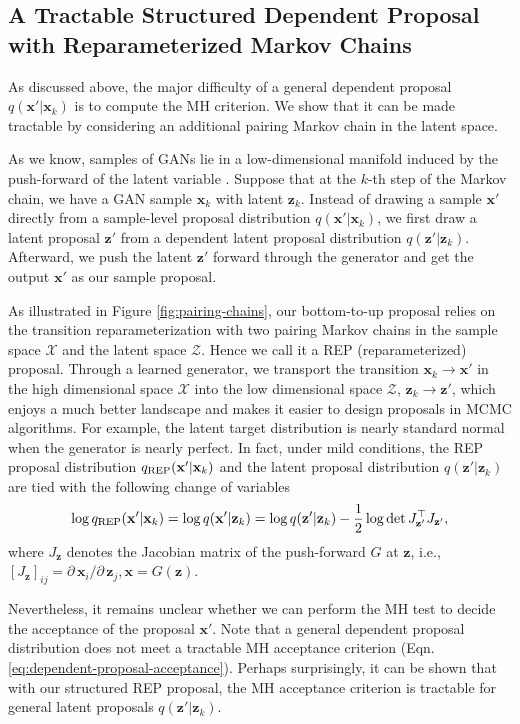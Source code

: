 \documentclass[runningheads]{llncs}
\newcommand{\bx}{\mathbf{x}}
\newcommand{\bz}{\mathbf{z}}
\newcommand{\cX}{\mathcal{X}}
\newcommand{\cZ}{\mathcal{Z}}
\newcommand{\<}{\left\langle}
\renewcommand{\>}{\right\rangle}
\begin{document}
\subsection{A Tractable Structured Dependent Proposal with Reparameterized Markov Chains}
As discussed above, the major difficulty of a general dependent proposal $q(\bx'|\bx_k)$ is to compute the MH criterion. We show that it can be made tractable by considering an additional pairing Markov chain in the latent space.

As we know, samples of GANs lie in a low-dimensional manifold induced by the push-forward of the latent variable \cite{arjovsky2017wasserstein}. Suppose that at the $k$-th step of the Markov chain, we have a GAN sample $\bx_k$ with latent $\bz_k$. Instead of drawing a sample $\bx'$ directly from a sample-level proposal distribution $q(\bx'|\bx_k)$, we first draw a latent proposal $\bz'$ from a dependent latent proposal distribution $q(\bz'|\bz_k)$. Afterward, we push the latent $\bz'$ forward through the generator and get the output $\bx'$ as our sample proposal. 

As illustrated in Figure \ref{fig:pairing-chains}, our bottom-to-up proposal relies on the transition reparameterization with two pairing Markov chains in the sample space $\cX$ and the latent space $\cZ$. Hence we call it a REP (reparameterized) proposal. Through a learned generator, we transport the transition $\bx_k\to\bx'$ in the high dimensional space $\cX$ into the low dimensional space $\cZ$, $\bz_k\to\bz'$, which enjoys a much better landscape and makes it easier to design proposals in MCMC algorithms. For example, the latent target distribution is nearly standard normal when the generator is nearly perfect.
In fact, under mild conditions, the REP proposal distribution $q_{\rm REP}(\bx'|\bx_k)$ and the latent proposal distribution $q(\bz'|\bz_k)$ are tied with the following change of variables \cite{gemici2016normalizing,ben1999change}
\begin{equation}
    \log q_{\rm REP}(\bx'|\bx_k)= \log q(\bx'|\bz_k)
    =\log q(\bz'|\bz_k) - \frac{1}{2}\log\det J_{\bz'}^\top J_{\bz'},
    \label{eq:cmc-proposal-change-of-variable}
\end{equation}
where $J_\bz$ denotes the Jacobian matrix of the push-forward $G$ at $\bz$, i.e., $\left[J_\bz\right]_{ij} = \partial\,\bx_i/\partial\,\bz_j, \bx=G(\bz)$.

Nevertheless, it remains unclear whether we can perform the MH test to decide the acceptance of the proposal $\bx'$. Note that a general dependent proposal distribution does not meet a tractable MH acceptance criterion (Eqn. \eqref{eq:dependent-proposal-acceptance}). Perhaps surprisingly, 
it can be shown that with our structured REP proposal, 
the MH acceptance criterion is tractable for general latent proposals $q(\bz'|\bz_k)$. 
\end{document}
